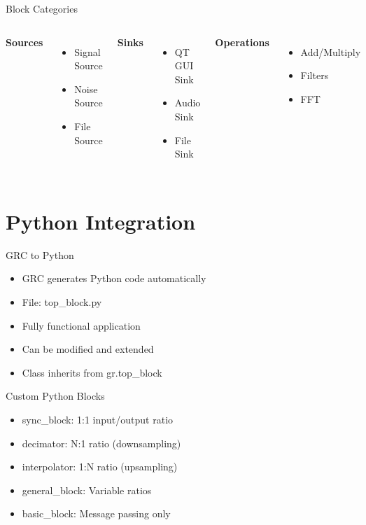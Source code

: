 \documentclass[aspectratio=169,11pt]{beamer}
\begin{document}
\begin{frame}{Block Categories}
\begin{columns}
\textbf{Sources}
\begin{itemize}
    \item Signal Source
    \item Noise Source
    \item File Source
\end{itemize}

\textbf{Sinks}
\begin{itemize}
    \item QT GUI Sink
    \item Audio Sink
    \item File Sink
\end{itemize}

\textbf{Operations}
\begin{itemize}
    \item Add/Multiply
    \item Filters
    \item FFT
\end{itemize}
\end{columns}
\end{frame}

\section{Python Integration}
\begin{frame}{GRC to Python}
\begin{itemize}
    \item GRC generates Python code automatically
    \item File: top\_block.py
    \item Fully functional application
    \item Can be modified and extended
    \item Class inherits from gr.top\_block
\end{itemize}
\end{frame}

\begin{frame}{Custom Python Blocks}
\begin{itemize}
    \item sync\_block: 1:1 input/output ratio
    \item decimator: N:1 ratio (downsampling)
    \item interpolator: 1:N ratio (upsampling)
    \item general\_block: Variable ratios
    \item basic\_block: Message passing only
\end{itemize}
\end{frame}
\end{document}
